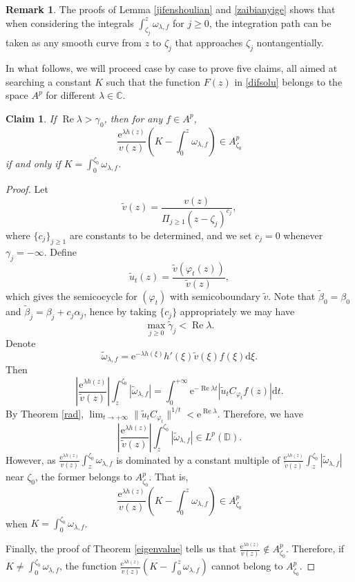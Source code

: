 \documentclass{amsart}
\theoremstyle{proclaim}
\newtheorem{claim}[theorem]{Claim}
\theoremstyle{fancyproclaim}
\theoremstyle{definition}
\newtheorem{remark}[theorem]{Remark}
\theoremstyle{fancystatement}
\numberwithin{equation}{section}
\begin{document}
\begin{remark}\label{zuihouremark}
The proofs of Lemma \ref{jifenshoulian} and \ref{zaibianyige} shows that when considering the integrals  $\int^z_{\zeta_j}\omega_{\lambda,f}$ for $j\geq0$, the integration path can be taken as any smooth curve from $z$ to $\zeta_j$ that approaches $\zeta_j$ nontangentially.
\end{remark}




In what follows, we will proceed case by case to prove five claims, all aimed at searching a constant $K$ such that the function $F(z)$ in \eqref{difsolu} belongs to the space $A^p$ for different $\lambda\in\mathbb{C}$.

\begin{claim}\label{>0}
If $ \operatorname{Re}\lambda>\gamma_0$, then for any $f\in A^p$,
$$\frac{ \mathrm{e}^{\lambda h(z)}}{v(z)}\left(K-\int_0^z\omega_{\lambda,f}\right)\in A^p_{\zeta_0}$$
if and only if $K=\int_0^{\zeta_0}\omega_{\lambda,f}$.
\end{claim}

\begin{proof}
Let 
$$\tilde{v}(z)=\frac{v(z)}{\Pi_{j\geq1}(z-\zeta_j)^{c_j}},$$
where $\{c_j\}_{j\geq 1}$ are constants to be determined, and we set $c_j=0$ whenever $\gamma_j=-\infty$. Define
$$\tilde{u}_t(z)=\frac{\tilde{v}(\varphi_t(z))}{\tilde{v}(z)},$$
which gives the semicocycle for $(\varphi_t)$ with semicoboundary $\tilde{v}$. Note that  $\tilde{\beta}_0=\beta_0$ and $\tilde{\beta}_j=\beta_j+c_j\alpha_j$, hence by taking $\{c_j\}$ appropriately we may have
$$\max_{j\geq0}\tilde{\gamma}_j<\operatorname{Re}\lambda.$$ 
Denote
$$\tilde{\omega}_{\lambda,f}=\mathrm{e}^{-\lambda h(\xi)}h'(\xi)\tilde{v}(\xi)f(\xi) \mathrm{d}\xi.$$
Then 
$$\left|\frac{ \mathrm{e}^{\lambda h(z)}}{\tilde{v}(z)}\right|\int_z^{\zeta_0}|\tilde{\omega}_{\lambda,f}|=\int_0^{+\infty} \mathrm{e}^{-\operatorname{Re}\lambda t}\left|\tilde{u}_tC_{\varphi_t}f(z)\right| \mathrm{d}t.$$
By Theorem \ref{rad}, $\lim_{t\to+\infty}\|\tilde{u}_tC_{\varphi_t}\|^{1/t}< \mathrm{e}^{\operatorname{Re}\lambda}$. Therefore, we have
$$\left|\frac{ \mathrm{e}^{\lambda h(z)}}{\tilde{v}(z)}\right|\int_z^{\zeta_0}|\tilde{\omega}_{\lambda,f}|\in L^p(\mathbb{D}).$$
However, as $\frac{ \mathrm{e}^{\lambda h(z)}}{v(z)}\int_z^{\zeta_0}\omega_{\lambda,f}$ is dominated by a constant multiple of $\frac{ \mathrm{e}^{\lambda h(z)}}{\tilde{v}(z)}\int_z^{\zeta_0}|\tilde{\omega}_{\lambda,f}|$ near $\zeta_0$, the former belongs to $A^p_{\zeta_0}$. That is, 
$$\frac{ \mathrm{e}^{\lambda h(z)}}{v(z)}\left(K-\int_0^z\omega_{\lambda,f}\right)\in A^p_{\zeta_0}$$
when $K=\int_0^{\zeta_0}\omega_{\lambda,f}$. 

Finally, the proof of Theorem \ref{eigenvalue} tells us that $\frac{ \mathrm{e}^{\lambda h(z)}}{v(z)}\notin A_{\zeta_0}^p$. Therefore, if $K\ne\int_0^{\zeta_0}\omega_{\lambda,f}$, the function $\frac{ \mathrm{e}^{\lambda h(z)}}{v(z)}\left(K-\int_0^z\omega_{\lambda,f}\right)$ cannot belong to $A^p_{\zeta_0}$.
\end{proof}
\end{document}
